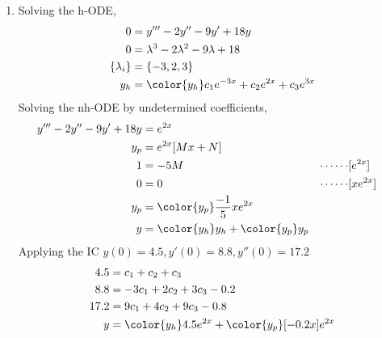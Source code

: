 \begin{enumerate}
    \item Solving the h-ODE,
          \begin{align}
              0               & = y''' - 2y'' - 9y'+ 18y                            \\
              0               & = \lambda^{3} - 2\lambda^{2} - 9\lambda + 18        \\
              \{\lambda_{i}\} & = \{-3, 2, 3\}                                      \\
              y_{h}           & = \color{y_h} c_1 e^{-3x} + c_2 e^{2x} + c_3 e^{3x}
          \end{align}
          Solving the nh-ODE by undetermined coefficients,
          \begin{align}
              y''' - 2y'' - 9y'+ 18y & = e^{2x}                                                               \\
              y_{p}                  & = e^{2x}[Mx + N]                                                       \\
              1                      & = -5M                                       & \cdots\cdots & [e^{2x}]  \\
              0                      & = 0                                         & \cdots\cdots & [xe^{2x}] \\
              y_{p}                  & = \color{y_p} \frac{-1}{5}xe^{2x}                                      \\
              y                      & = {\color{y_h} y_{h}} + {\color{y_p} y_{p}}
          \end{align}
          Applying the IC $ y(0) = 4.5, y'(0) = 8.8, y''(0) = 17.2 $
          \begin{align}
              4.5  & = c_1 + c_2 + c_3                                       \\
              8.8  & = -3c_1 + 2c_2 + 3c_3 - 0.2                             \\
              17.2 & = 9c_1 + 4c_2 + 9c_3 - 0.8                              \\
              y    & = {\color{y_h} 4.5e^{2x}} + {\color{y_p} [-0.2x]e^{2x}}
          \end{align}
          \begin{figure}[H]
              \centering
              \begin{tikzpicture}[
                      declare function = {
                              y_p = e^(2*x)*(4.5 - 0.2*x);
                              y_h = e^(2*x)*4.5;
                          }
                  ]

\end{tikzpicture}
\end{figure}
\end{enumerate}
